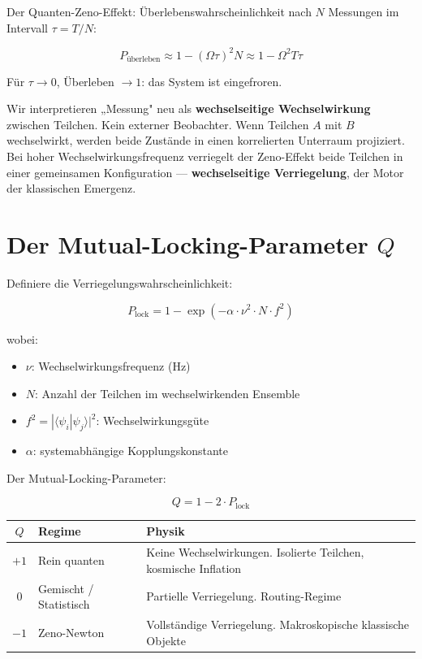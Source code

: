 \documentclass[12pt]{article}
\begin{document}
Der Quanten-Zeno-Effekt: Überlebenswahrscheinlichkeit nach $N$ Messungen im Intervall $\tau = T/N$:

\begin{equation}
P_{\text{überleben}} \approx 1 - (\Omega\tau)^2 N \approx 1 - \Omega^2 T \tau
\end{equation}

Für $\tau \to 0$, Überleben $\to 1$: das System ist eingefroren.

Wir interpretieren „Messung" neu als \textbf{wechselseitige Wechselwirkung} zwischen Teilchen. Kein externer Beobachter. Wenn Teilchen $A$ mit $B$ wechselwirkt, werden beide Zustände in einen korrelierten Unterraum projiziert. Bei hoher Wechselwirkungsfrequenz verriegelt der Zeno-Effekt beide Teilchen in einer gemeinsamen Konfiguration — \textbf{wechselseitige Verriegelung}, der Motor der klassischen Emergenz.

\section{Der Mutual-Locking-Parameter $Q$}

Definiere die Verriegelungswahrscheinlichkeit:

\begin{equation}
P_{\text{lock}} = 1 - \exp(-\alpha \cdot \nu^2 \cdot N \cdot f^2)
\end{equation}

wobei:
\begin{itemize}
\item $\nu$: Wechselwirkungsfrequenz (Hz)
\item $N$: Anzahl der Teilchen im wechselwirkenden Ensemble
\item $f^2 = |\langle\psi_i|\psi_j\rangle|^2$: Wechselwirkungsgüte
\item $\alpha$: systemabhängige Kopplungskonstante
\end{itemize}

Der Mutual-Locking-Parameter:

\begin{equation}
Q = 1 - 2 \cdot P_{\text{lock}}
\end{equation}

\begin{center}
\begin{tabular}{c|l|l}
$Q$ & Regime & Physik \\
\hline
$+1$ & Rein quanten & Keine Wechselwirkungen. Isolierte Teilchen, kosmische Inflation \\
$0$ & Gemischt / Statistisch & Partielle Verriegelung. Routing-Regime \\
$-1$ & Zeno-Newton & Vollständige Verriegelung. Makroskopische klassische Objekte \\
\end{tabular}
\end{center}
\end{document}
